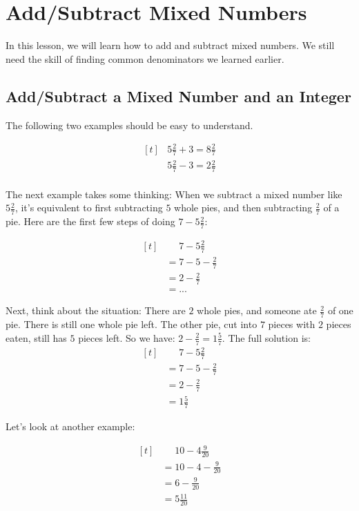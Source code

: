 
\section{Add/Subtract Mixed Numbers}

In this lesson, we will learn how to add and subtract mixed numbers. We still need the skill of finding common denominators we learned earlier.

\subsection{Add/Subtract a Mixed Number and an Integer}

The following two examples should be easy to understand.

\begin{myexample}
\[ 
\begin{aligned}[t]
	&5\frac{2}{7}+3 = 8\frac{2}{7} \\
	&5\frac{2}{7}-3 = 2\frac{2}{7} \\
\end{aligned}
\]
\end{myexample}

The next example takes some thinking: When we subtract a mixed number like $5\frac{2}{7}$, it's equivalent to first subtracting $5$ whole pies, and then subtracting $\frac{2}{7}$ of a pie. Here are the first few steps of doing $7-5\frac{2}{7}$:

\[ 
\begin{aligned}[t]
	&\phantom{{}=} 7-5\frac{2}{7} \\
	&= 7-5-\frac{2}{7} \\
	&= 2-\frac{2}{7} \\
	&= ...
\end{aligned}
\]

Next, think about the situation: There are $2$ whole pies, and someone ate $\frac{2}{7}$ of one pie. There is still one whole pie left. The other pie, cut into $7$ pieces with $2$ pieces eaten, still has $5$ pieces left. So we have: $2-\frac{2}{7}=1\frac{5}{7}$. The full solution is:
\[ 
\begin{aligned}[t]
	&\phantom{{}=} 7-5\frac{2}{7} \\
	&= 7-5-\frac{2}{7} \\
	&= 2-\frac{2}{7} \\
	&= 1\frac{5}{7}
\end{aligned}
\]

Let's look at another example:
\begin{myexample}
\[ 
\begin{aligned}[t]
	&\phantom{{}=}10-4\frac{9}{20} \\
	&=10-4-\frac{9}{20} \\
	&=6-\frac{9}{20} \\
	&=5\frac{11}{20}
\end{aligned}
\]
\end{myexample}

